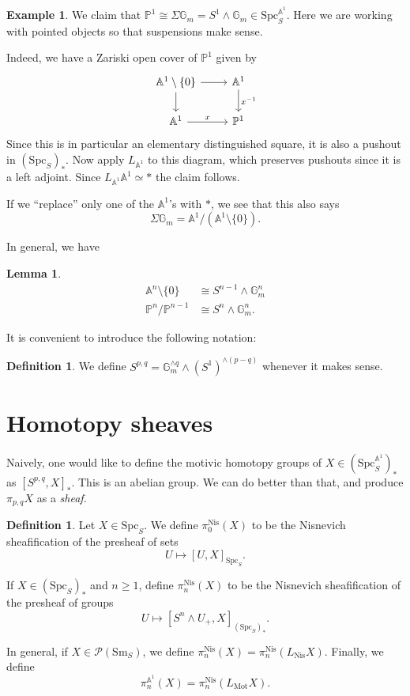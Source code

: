 \documentclass{shortart}
\newtheorem{lemma}[thm]{Lemma}
\theoremstyle{definition}
\newtheorem{defi}[thm]{Definition}
\newtheorem{eg}[thm]{Example}
\newcommand\Sm{\mathrm{Sm}}
\newcommand\Spc{\mathrm{Spc}}
\newcommand\Nis{\mathrm{Nis}}
\newcommand\Pre{\mathcal{P}}
\renewcommand\P{\mathbb{P}}
\newcommand\A{\mathbb{A}}
\newcommand\G{\mathbb{G}}
\newcommand\Mot{\mathrm{Mot}}
\begin{document}
\begin{eg}
  We claim that $\P^1 \cong \Sigma \G_m = S^1 \wedge \G_m \in \Spc_S^{\A^1}$. Here we are working with pointed objects so that suspensions make sense.

  Indeed, we have a Zariski open cover of $\P^1$ given by
  \[
    \begin{tikzcd}
      \A^1 \setminus \{0\} \ar[r] \ar[d] & \A^1 \ar[d, "x^{-1}"]\\
      \A^1 \ar[r, "x"] & \P^1
    \end{tikzcd}
  \]
  Since this is in particular an elementary distinguished square, it is also a pushout in $(\Spc_S)_*$. Now apply $L_{\A^1}$ to this diagram, which preserves pushouts since it is a left adjoint. Since $L_{\A^1} \A^1 \simeq *$ the claim follows.

  If we ``replace'' only one of the $\A^1$'s with $*$, we see that this also says
  \[
    \Sigma \G_m = \A^1 / (\A^1 \setminus \{0\}).
  \]
\end{eg}

In general, we have
\begin{lemma}
  \[
    \begin{aligned}
      \A^n \setminus \{0\} &\cong S^{n - 1} \wedge \G_m^n\\
      \P^n / \P^{n - 1} &\cong S^n \wedge \G_m^n.
    \end{aligned}
  \]
\end{lemma}

It is convenient to introduce the following notation:
\begin{defi}
  We define $S^{p, q} = \G_m^{\wedge q} \wedge (S^1)^{\wedge (p - q)}$ whenever it makes sense.
\end{defi}

\section{Homotopy sheaves}\label{chapter:homotopy-sheaves}
Naively, one would like to define the motivic homotopy groups of $X \in (\Spc_S^{\A^1})_*$ as $[S^{p, q}, X]_*$. This is an abelian group. We can do better than that, and produce $\pi_{p, q} X$ as a \emph{sheaf}.

\begin{defi}
  Let $X \in \Spc_S$. We define $\pi_0^{\Nis}(X)$ to be the Nisnevich sheafification of the presheaf of sets
  \[
    U \mapsto [U, X]_{\Spc_S}.
  \]

  If $X \in (\Spc_S)_*$ and $n \geq 1$, define $\pi_n^{\Nis}(X)$ to be the Nisnevich sheafification of the presheaf of groups
  \[
    U \mapsto [S^n \wedge U_+, X]_{(\Spc_S)_*}.
  \]

  In general, if $X \in \Pre(\Sm_S)$, we define $\pi_n^{\Nis}(X) = \pi_n^{\Nis}(L_{\Nis} X)$. Finally, we define
  \[
    \pi_n^{\A^1}(X) = \pi_n^{\Nis}(L_{\Mot}X).
  \]
\end{defi}
\end{document}
